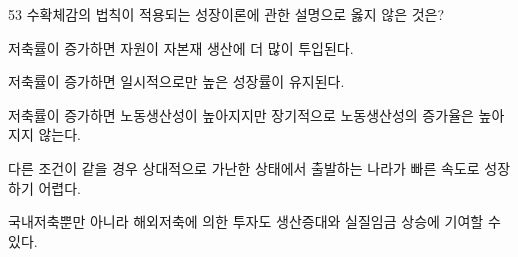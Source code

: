 \begin{question}{53}
수확체감의 법칙이 적용되는 성장이론에 관한 설명으로 옳지 않은 것은?
\begin{choices}
  \item 저축률이 증가하면 자원이 자본재 생산에 더 많이 투입된다.
  \item 저축률이 증가하면 일시적으로만 높은 성장률이 유지된다.
  \item 저축률이 증가하면 노동생산성이 높아지지만 장기적으로 노동생산성의 증가율은 높아지지 않는다.
  \item 다른 조건이 같을 경우 상대적으로 가난한 상태에서 출발하는 나라가 빠른 속도로 성장하기 어렵다.
  \item 국내저축뿐만 아니라 해외저축에 의한 투자도 생산증대와 실질임금 상승에 기여할 수 있다.
\end{choices}
\end{question}
